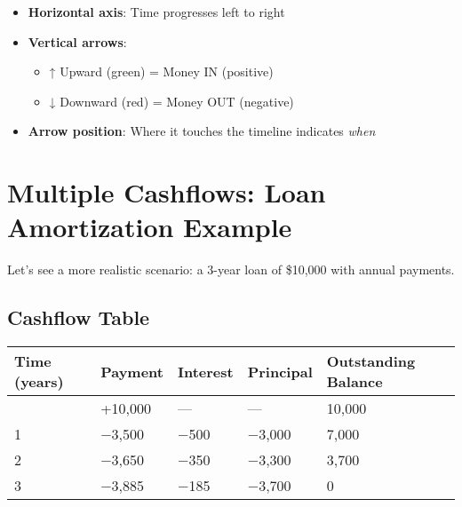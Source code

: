 \documentclass[
  letterpaper,
]{scrbook}
\providecommand{\tightlist}{%
  \setlength{\itemsep}{0pt}\setlength{\parskip}{0pt}}
\begin{document}
\FloatBarrier

\begin{tcolorbox}[enhanced jigsaw, toptitle=1mm, colbacktitle=quarto-callout-tip-color!10!white, opacityback=0, leftrule=.75mm, breakable, colframe=quarto-callout-tip-color-frame, toprule=.15mm, opacitybacktitle=0.6, coltitle=black, bottomrule=.15mm, colback=white, arc=.35mm, titlerule=0mm, rightrule=.15mm, left=2mm, title=\textcolor{quarto-callout-tip-color}{\faLightbulb}\hspace{0.5em}{Reading Timeline Diagrams}, bottomtitle=1mm]

\begin{itemize}
\tightlist
\item
  \textbf{Horizontal axis}: Time progresses left to right
\item
  \textbf{Vertical arrows}:

  \begin{itemize}
  \tightlist
  \item
    {↑ Upward (green)} = Money IN (positive)
  \item
    {↓ Downward (red)} = Money OUT (negative)
  \end{itemize}
\item
  \textbf{Arrow position}: Where it touches the timeline indicates
  \emph{when}
\end{itemize}

\end{tcolorbox}

\section{Multiple Cashflows: Loan Amortization
Example}\label{multiple-cashflows-loan-amortization-example}

Let's see a more realistic scenario: a 3-year loan of \$10,000 with
annual payments.

\subsection{Cashflow Table}\label{cashflow-table}

\begin{longtable}[]{@{}lllll@{}}
\toprule\noalign{}
Time (years) & Payment & Interest & Principal & Outstanding Balance \\
\midrule\noalign{}
\endhead
\bottomrule\noalign{}
\endlastfoot
0 & +10,000 & --- & --- & 10,000 \\
1 & −3,500 & −500 & −3,000 & 7,000 \\
2 & −3,650 & −350 & −3,300 & 3,700 \\
3 & −3,885 & −185 & −3,700 & 0 \\
\end{longtable}
\end{document}
